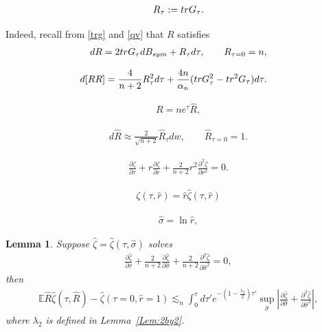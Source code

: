 \documentclass[10pt,a4paper]{amsart}
\newtheorem{lemma}{Lemma}
\def\bbE{\mathbb E}
\def\tr{{\rm tr}}
\begin{document}
\begin{align}\label{R}
    R_\tau:=\tr G_\tau.
\end{align}

Indeed, recall from \eqref{trg} and \eqref{qv} that $R$ satisfies  \begin{align}
dR=2\tr G_\tau dB_{sym}+R_\tau d\tau, \quad \quad R_{\tau=0}=n ,\label{RSDE}
\end{align}

\begin{align}\label{QuadVarR}
        d[RR]&=\frac{4}{n+2}R_\tau^2 d\tau+\frac{4n}{\alpha_n} (\tr G_\tau^2-\tr^2 G_\tau)d\tau .   \end{align}

\begin{align}\label{Rhat}
  R=n e^{\tau} \hat R ,
\end{align}

 \begin{align}\label{Rhatapprox}
   d\hat R \approx \frac{2}{\sqrt{n+2}}\hat R_{ \tau} dw, \quad \quad \hat R_{ \tau=0}=1. 
\end{align}

\begin{align}\label{backwardpde}
	   \frac{\partial \zeta}{\partial \tau}+r \frac{\partial \zeta}{\partial r}+\frac{2 }{n+2}r^2\frac{\partial^2\zeta}{\partial  r^2}=0.
\end{align}

 \begin{align}
    \zeta(\tau,\hat r)=\hat r \hat 
\zeta(\tau,\hat r) \label{zetatohatzeta}
\end{align} 

\begin{align}\label{sigmahat}
    \hat \sigma = \ln \hat r ,
\end{align}

\begin{lemma}\label{lem:zeta} 
   Suppose $\hat \zeta=\hat\zeta(\tau,\hat\sigma)$ solves \begin{align}\label{zetahat2}
\frac{\partial \hat \zeta}{\partial \tau}+\frac{2}{n+2}\frac{\partial \hat \zeta}{\partial\hat \sigma }+ \frac{2}{n+2}\frac{\partial^2 \hat \zeta}{\partial \hat \sigma^2}=0,
\end{align}
then \begin{align} \label{zetahatineq}
    \bbE \hat R \hat \zeta(\tau, \hat R) - \hat \zeta(\tau=0,\hat r= 1 ) \lesssim_{ n } \int_0^{\tau} d\tau' e^{-(1-\frac{\lambda_2}{2})\tau'} \sup_{\hat \sigma} \left|\frac{\partial \hat \zeta}{\partial\hat \sigma}+ \frac{\partial^2 \hat \zeta}{\partial\hat \sigma^2} \right|  ,
 \end{align}
 where $\lambda_2$ is defined in Lemma~\ref{Lem:2by2}. 
\end{lemma}
\end{document}
